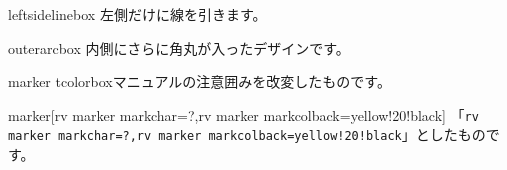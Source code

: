 \begin{rv@leftsidelinebox@caption}{leftsidelinebox}
左側だけに線を引きます。
\end{rv@leftsidelinebox@caption}

\begin{rv@outerarcbox@caption}{outerarcbox}
内側にさらに角丸が入ったデザインです。
\end{rv@outerarcbox@caption}

\begin{rv@marker@caption}{marker}
tcolorboxマニュアルの注意囲みを改変したものです。
\end{rv@marker@caption}

\begin{rv@marker@caption}{marker}[rv marker markchar=?,rv marker markcolback=yellow!20!black]
「\texttt{rv marker markchar=?,rv marker markcolback=yellow!20!black}」としたものです。
\end{rv@marker@caption}

\endinput

\begin{rv@squarebox@nocaption}
日本語

TEST TEST TEST

日本語日本語日本語日本語日本語日本語日本語日本語日本語日本語日本語日本語日本語日本語日本語日本語日本語日本語日本語

\end{rv@squarebox@nocaption}

\begin{rv@squarebox@nocaption}
日本語日本語日本語日本語日本語日本語日本語日本語日本語日本語日本語日本語日本語日本語日本語日本語日本語日本語日本語

日本語日本語日本語日本語日本語日本語日本語日本語日本語日本語日本語日本語日本語日本語日本語日本語日本語日本語日本語
TEST TEST TEST

TEST TEST TEST

TEST TEST TEST

TEST TEST TEST

TEST TEST TEST

TEST TEST TEST

TEST TEST TEST

TEST TEST TEST

TEST TEST TEST

TEST TEST TEST

TEST TEST TEST

TEST TEST TEST

TEST TEST TEST

TEST TEST TEST

TEST TEST TEST

\end{rv@squarebox@nocaption}


